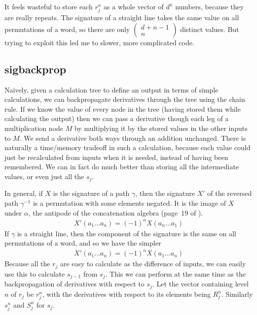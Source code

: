 \def\pbinomjr#1#2{\left(\begin{smallmatrix}#1\\#2\end{smallmatrix}\right)}
It feels wasteful to store each $r_j^n$ as a whole vector of $d^n$ numbers, because they are really repeats. The signature of a straight line takes the same value on all permutations of a word, so there are only $\pbinomjr{d+n-1}{n}$ distinct values. %
But trying to exploit this led me to slower, more complicated code.

\subsection{sigbackprop}
Naively, given a calculation tree to define an output in terms of simple calculations, we can backpropagate derivatives through the tree using the chain rule. If we know the value of every node in the tree (having stored them while calculating the output) then we can pass a derivative though each leg of a multiplication node $M$ by multiplying it by the stored values in the other inputs to $M$. We send a derivative both ways through an addition unchanged. 
There is naturally a time/memory tradeoff in such a calculation, because each value could just be recalculated from inputs when it is needed, instead of having been remembered. We can in fact do much better than storing all the intermediate values, or even just all the $s_j$.

In general, if $X$ is the signature of a path $\gamma$, then the signature $X'$ of the reversed path $\gamma^{-1}$ is a permutation with some elements negated. It is the image of $X$ under $\alpha$, the antipode of the concatenation algebra (page~19 of \cite{FLA}).
\begin{align}
X'(a_1\dots a_n)=(-1)^nX(a_n \dots a_1)
\end{align}
If $\gamma$ is a straight line, then the component of the signature is the same on all permutations of a word, and so we have the simpler
\begin{align}
X'(a_1\dots a_n)=(-1)^nX(a_1\dots a_n) \label{eq:loseStraightSeg}
\end{align}
Because all the $r_j$ are easy to calculate as the difference of inputs, we can easily use this to calculate $s_{j-1}$ from $s_j$. This we can perform at the same time as the backpropagation of derivatives with respect to $s_j$.
Let the vector containing level $n$ of $r_j$ be $r_j^n$, with the derivatives with respect to its elements being $R_j^n$. Similarly $s_j^n$ and $S_j^n$ for $s_j$. 

